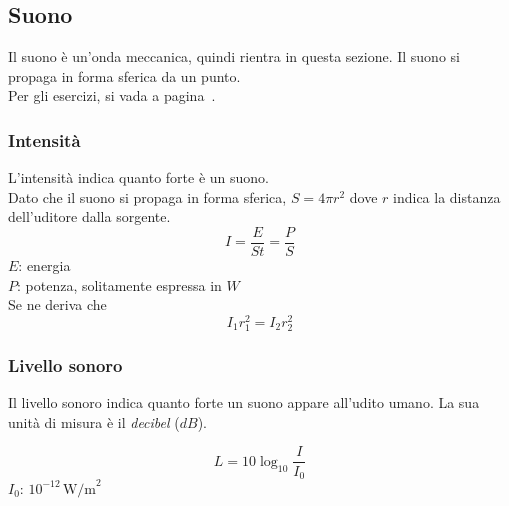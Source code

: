 \subsection{Suono}\label{subsec:onde:suono}
Il suono è un'onda meccanica, quindi rientra in questa sezione. Il suono si propaga in forma
sferica da un punto.\\[\baselineskip]
Per gli esercizi, si vada a pagina~\pageref{ex:suono}.

\subsubsection{Intensità}
L'intensità indica quanto forte è un suono. \\
Dato che il suono si propaga in forma sferica, 
$S = 4\pi r^2$ dove $r$ indica la distanza dell'uditore dalla sorgente.
\begin{equation*}
  I = \frac{E}{St} = \frac{P}{S}
\end{equation*}
$E$: energia\\
$P$: potenza, solitamente espressa in $W$\\[\baselineskip]
Se ne deriva che
\begin{equation*}
  I_1r_1^2 = I_2r_2^2
\end{equation*}
\begin{center}
\end{center}


\subsubsection{Livello sonoro}
Il livello sonoro indica quanto forte un suono appare all'udito umano. La sua unità di misura è il
\emph{decibel} ($dB$).

\begin{equation*}
  L = 10\log_{10}\frac{I}{I_0}
\end{equation*}
\hyperref[tab:I0]{$I_0$}: $10^{-12}\,\text{W/m}^2$

